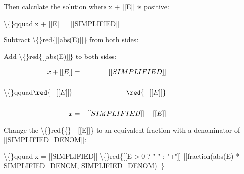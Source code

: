 \documentclass{article}
\begin{document}
\begin{itemize}
                                    Then calculate the solution where
                                    x + [[E]] is positive:
                                
                                \textbackslash\{\}qquad
                                    x + [[E]] = [[SIMPLIFIED]]
                                
                            
                            
                                
                                    Subtract
                                    \textbackslash\{\}red\{[[abs(E)]]\}
                                    from both
                                    sides:
                                
                                    Add
                                    \textbackslash\{\}red\{[[abs(E)]]\}
                                    to both
                                    sides:
                                
                                \textbackslash\{\}qquad$\begin{aligned}
                                    x + [[E]] &=&
                                    [[SIMPLIFIED]] \\ \\
                                    \red{- [[E]]} &&
                                    \red{- [[E]]} \\ \\
                                    x &=& [[SIMPLIFIED]] -
                                    [[E]]
                                    \end{aligned}$
                                
                            
                            
                                
                                    Change the
                                    \textbackslash\{\}red\{\{\} - [[E]]\}
                                    to an equivalent fraction with a
                                    denominator of
                                    [[SIMPLIFIED\_DENOM]]:
                                
                                \textbackslash\{\}qquad
                                    x = [[SIMPLIFIED]]
                                    \textbackslash\{\}red\{[[E > 0 ? "-" : "+"]]
                                    [[fraction(abs(E) * SIMPLIFIED\_DENOM,
                                    SIMPLIFIED\_DENOM)]]\}
                                

\end{itemize}
\end{document}
